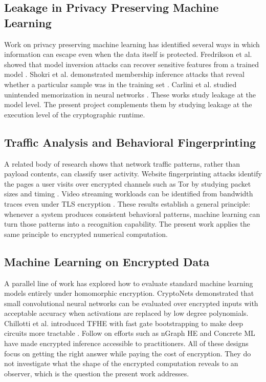 \documentclass[12pt,a4paper]{article}
\begin{document}
\subsection{Leakage in Privacy Preserving Machine Learning}
Work on privacy preserving machine learning has identified several ways in which information can escape even when the data itself is protected. Fredrikson et al. showed that model inversion attacks can recover sensitive features from a trained model \cite{fredrikson2015model}. Shokri et al. demonstrated membership inference attacks that reveal whether a particular sample was in the training set \cite{shokri2017membership}. Carlini et al. studied unintended memorization in neural networks \cite{carlini2019secret}. These works study leakage at the model level. The present project complements them by studying leakage at the execution level of the cryptographic runtime.

\subsection{Traffic Analysis and Behavioral Fingerprinting}
A related body of research shows that network traffic patterns, rather than payload contents, can classify user activity. Website fingerprinting attacks identify the pages a user visits over encrypted channels such as Tor by studying packet sizes and timing \cite{panchenko2016website}. Video streaming workloads can be identified from bandwidth traces even under TLS encryption \cite{schuster2017beauty}. These results establish a general principle: whenever a system produces consistent behavioral patterns, machine learning can turn those patterns into a recognition capability. The present work applies the same principle to encrypted numerical computation.

\subsection{Machine Learning on Encrypted Data}
A parallel line of work has explored how to evaluate standard machine learning models entirely under homomorphic encryption. CryptoNets \cite{gilad2016cryptonets} demonstrated that small convolutional neural networks can be evaluated over encrypted inputs with acceptable accuracy when activations are replaced by low degree polynomials. Chillotti et al. introduced TFHE with fast gate bootstrapping to make deep circuits more tractable \cite{chillotti2020tfhe}. Follow on efforts such as nGraph HE and Concrete ML have made encrypted inference accessible to practitioners. All of these designs focus on getting the right answer while paying the cost of encryption. They do not investigate what the shape of the encrypted computation reveals to an observer, which is the question the present work addresses.
\end{document}

